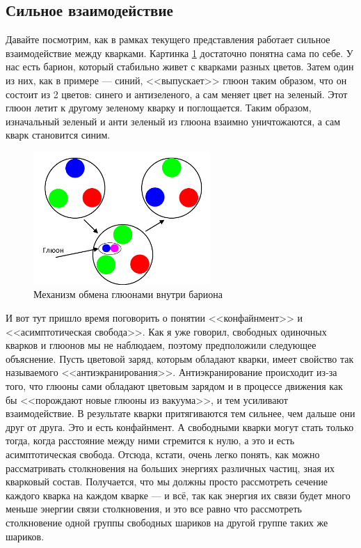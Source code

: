\documentclass[12pt]{article}
\begin{document}
\subsection{Сильное взаимодействие}
Давайте посмотрим, как в рамках текущего представления работает сильное взаимодействие между кварками. Картинка \ref{fig:sem_11_quark} достаточно понятна сама по себе. У нас есть барион, который стабильно живет с кварками разных цветов. Затем один из них, как в примере --- синий, <<выпускает>> глюон таким образом, что он состоит из 2 цветов: синего и антизеленого, а сам меняет цвет на зеленый. Этот глюон летит к другому зеленому кварку и поглощается. Таким образом, изначальный зеленый и анти зеленый из глюона взаимно уничтожаются, а сам кварк становится синим.
\begin{figure}[h]
    \centering
    \includegraphics[width=0.6\textwidth,height=\textheight,keepaspectratio]{Seminar_11-12/pics/pic_02_stong.pdf}
    \caption{Механизм обмена глюонами внутри бариона}
    \label{fig:sem_11_quark}
\end{figure}

\noindent
И вот тут пришло время поговорить о понятии <<конфайнмент>> и <<асимптотическая свобода>>. Как я уже говорил, свободных одиночных кварков и глюонов мы не наблюдаем, поэтому предположили следующее объяснение. Пусть цветовой заряд, которым обладают кварки, имеет свойство так называемого <<антиэкранирования>>. Антиэкранирование происходит из-за того, что глюоны сами обладают цветовым зарядом и в процессе движения как бы <<порождают новые глюоны из вакуума>>, и тем усиливают взаимодействие. В результате кварки притягиваются тем сильнее, чем дальше они друг от друга. Это и есть конфайнмент. А свободными кварки могут стать только тогда, когда расстояние между ними стремится к нулю, а это и есть асимптотическая свобода. Отсюда, кстати, очень легко понять, как можно рассматривать столкновения на больших энергиях различных частиц, зная их кварковый состав. Получается, что мы должны просто рассмотреть сечение каждого кварка на каждом кварке --- и всё, так как энергия их связи будет много меньше энергии связи столкновения, и это все равно что рассмотреть столкновение одной группы  свободных шариков на другой группе таких же шариков.
\end{document}
